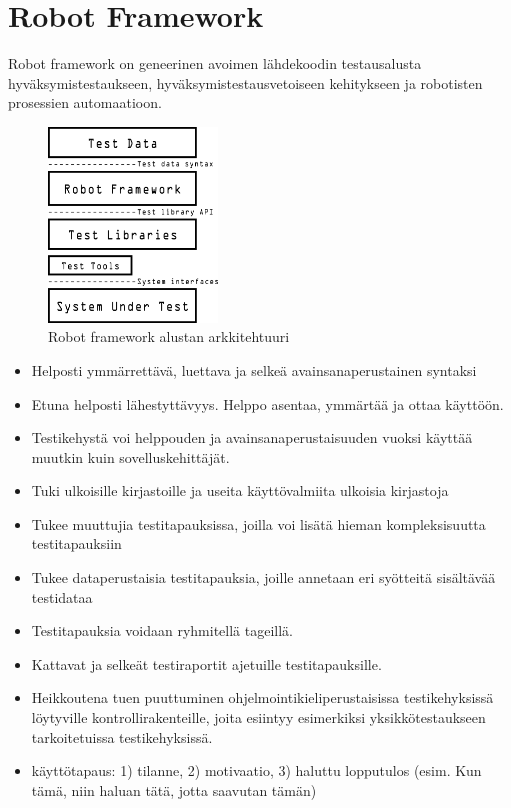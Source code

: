 \section{Robot Framework} \label{ch:08_robot_framework}

  Robot framework on geneerinen avoimen lähdekoodin testausalusta hyväksymistestaukseen, hyväksymistestausvetoiseen kehitykseen ja robotisten prosessien automaatioon.

  \begin{figure}[H]
    \centering
    \includegraphics[width=0.4\textwidth]{assets/robot-arkkitehtuuri.png}
    \caption{Robot framework alustan arkkitehtuuri}
    \label{fig:robot-architecture}
  \end{figure}

  \begin{itemize}
    \item Helposti ymmärrettävä, luettava ja selkeä avainsanaperustainen syntaksi
    \item Etuna helposti lähestyttävyys. Helppo asentaa, ymmärtää ja ottaa käyttöön.
    \item Testikehystä voi helppouden ja avainsanaperustaisuuden vuoksi käyttää muutkin kuin sovelluskehittäjät.
    \item Tuki ulkoisille kirjastoille ja useita käyttövalmiita ulkoisia kirjastoja
    \item Tukee muuttujia testitapauksissa, joilla voi lisätä hieman kompleksisuutta testitapauksiin
    \item Tukee dataperustaisia testitapauksia, joille annetaan eri syötteitä sisältävää testidataa
    \item Testitapauksia voidaan ryhmitellä tageillä.
    \item Kattavat ja selkeät testiraportit ajetuille testitapauksille.
    \item Heikkoutena tuen puuttuminen ohjelmointikieliperustaisissa testikehyksissä löytyville kontrollirakenteille, joita esiintyy esimerkiksi yksikkötestaukseen tarkoitetuissa testikehyksissä.
    \item käyttötapaus: 1) tilanne, 2) motivaatio, 3) haluttu lopputulos (esim. Kun tämä, niin haluan tätä, jotta saavutan tämän)
  \end{itemize}

